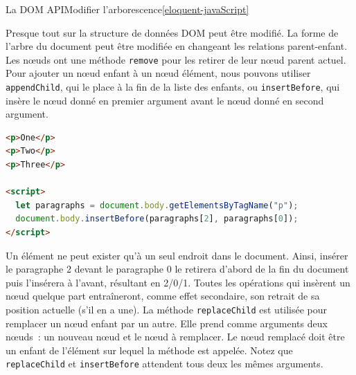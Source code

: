 \documentclass{beamer}
\begin{document}
    \begin{frame}[fragile]{La DOM API}{Modifier l'arborescence\cref{eloquent-javaScript}}
        \begin{tiny}
            Presque tout sur la structure de données DOM peut être modifié.
            La forme de l'arbre du document peut être modifiée en changeant les relations parent-enfant.
            Les nœuds ont une méthode \lstinline{remove} pour les retirer de leur nœud parent actuel.
            Pour ajouter un nœud enfant à un nœud élément, nous pouvons utiliser \lstinline{appendChild}, qui le place à la fin de la liste des enfants, ou \lstinline{insertBefore}, qui insère le nœud donné en premier argument avant le nœud donné en second argument.
        \end{tiny}
        \begin{lstlisting}[language=HTML,title={\tiny{HTML}},basicstyle=\tiny\ttfamily]
<p>One</p>
<p>Two</p>
<p>Three</p>

<script>
  let paragraphs = document.body.getElementsByTagName("p");
  document.body.insertBefore(paragraphs[2], paragraphs[0]);
</script>
        \end{lstlisting}
        \begin{tiny}
            Un élément ne peut exister qu'à un seul endroit dans le document.
            Ainsi, insérer le paragraphe 2 devant le paragraphe 0 le retirera d'abord de la fin du document puis l'insérera à l'avant, résultant en 2/0/1.
            Toutes les opérations qui insèrent un nœud quelque part entraîneront, comme effet secondaire, son retrait de sa position actuelle (s'il en a une).
            La méthode \lstinline{replaceChild} est utilisée pour remplacer un nœud enfant par un autre.
            Elle prend comme arguments deux nœuds~: un nouveau nœud et le nœud à remplacer.
            Le nœud remplacé doit être un enfant de l'élément sur lequel la méthode est appelée.
            Notez que \lstinline{replaceChild} et \lstinline{insertBefore} attendent tous deux les mêmes arguments.
        \end{tiny}
    \end{frame}
\end{document}
